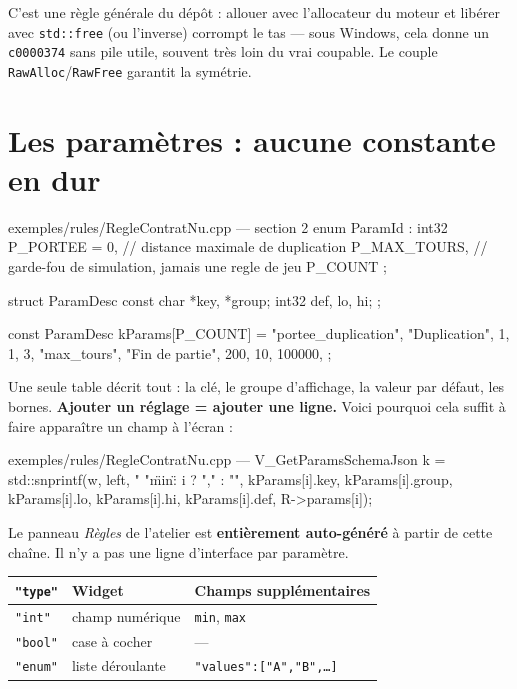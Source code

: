\begin{nkpiege}
C'est une règle générale du dépôt : allouer avec l'allocateur du moteur et
libérer avec \texttt{std::free} (ou l'inverse) corrompt le tas — sous Windows,
cela donne un \texttt{c0000374} sans pile utile, souvent très loin du vrai
coupable. Le couple \texttt{RawAlloc}/\texttt{RawFree} garantit la symétrie.
\end{nkpiege}

\section{Les paramètres : aucune constante en dur}

\begin{nkcode}{exemples/rules/RegleContratNu.cpp — section 2}
enum ParamId : int32 {
    P_PORTEE = 0,     // distance maximale de duplication
    P_MAX_TOURS,      // garde-fou de simulation, jamais une regle de jeu
    P_COUNT
};

struct ParamDesc { const char *key, *group; int32 def, lo, hi; };

const ParamDesc kParams[P_COUNT] = {
    {"portee_duplication", "Duplication",   1,  1,   3},
    {"max_tours",          "Fin de partie", 200, 10, 100000},
};
\end{nkcode}

Une seule table décrit tout : la clé, le groupe d'affichage, la valeur par
défaut, les bornes. \textbf{Ajouter un réglage = ajouter une ligne.} Voici
pourquoi cela suffit à faire apparaître un champ à l'écran :

\begin{nkcode}{exemples/rules/RegleContratNu.cpp — V\_GetParamsSchemaJson}
k = std::snprintf(w, left,
                  "%
                  "\"min\":%
                  i ? "," : "", kParams[i].key, kParams[i].group,
                  kParams[i].lo, kParams[i].hi, kParams[i].def, R->params[i]);
\end{nkcode}

Le panneau \emph{Règles} de l'atelier est \textbf{entièrement auto-généré} à
partir de cette chaîne. Il n'y a pas une ligne d'interface par paramètre.

\begin{center}
\begin{tabular}{@{}llp{5.6cm}@{}}
\toprule
\texttt{"type"} & \textbf{Widget} & \textbf{Champs supplémentaires} \\
\midrule
\texttt{"int"}  & champ numérique & \texttt{min}, \texttt{max} \\
\texttt{"bool"} & case à cocher & — \\
\texttt{"enum"} & liste déroulante & \texttt{"values":["A","B",\ldots]} \\
\bottomrule
\end{tabular}
\end{center}

